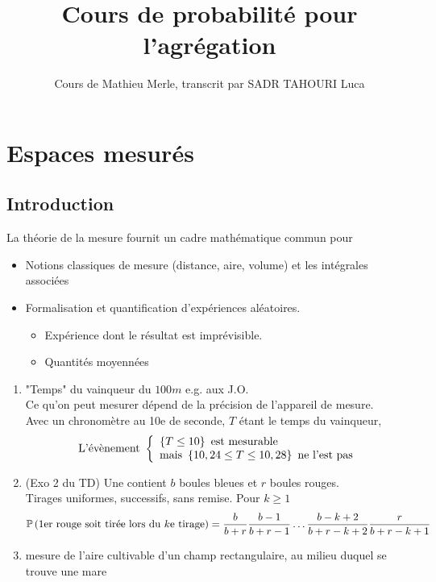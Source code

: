 \documentclass[]{report}
\title{Cours de probabilité pour l'agrégation}
\author{Cours de Mathieu Merle, transcrit par SADR TAHOURI Luca}
\date{}
\begin{document}
    \maketitle
    \tableofcontents

\chapter{Espaces mesurés}

\section{Introduction}

La théorie de la mesure fournit un cadre mathématique commun pour
\begin{itemize}
    \item Notions classiques de mesure (distance, aire, volume) et les intégrales associées
    \item Formalisation et quantification d'expériences aléatoires.
    \begin{itemize}[label=$\hookrightarrow$]
        \item Expérience dont le résultat est imprévisible.
        \item Quantités moyennées
    \end{itemize}
\end{itemize}

\begin{ex}{}{}
    \begin{enumerate}
        \item "Temps" du vainqueur du $100m$ e.g. aux J.O.\\
        Ce qu'on peut mesurer dépend de la précision de l'appareil de mesure.\\
        Avec un chronomètre au 10e de seconde, $T$ étant le temps du vainqueur,
        \[\text{L'évènement } \left\{\begin{array}{ll} \left\{ T\le 10\right\}\text{ est mesurable}\\ \text{mais }\left\{10,24\le T\le 10,28\right\}\text{ ne l'est pas}  \end{array} \right.\]
        \item (Exo 2 du TD) Une contient $b$ boules bleues et $r$ boules rouges.\\
        Tirages uniformes, successifs, sans remise. Pour $k\ge 1$
        \[\mathbb{P}\left(\text{1er rouge soit tirée lors du $k$e tirage}\right)=\dfrac{b}{b+r}\dfrac{b-1}{b+r-1}\ldots \dfrac{b-k+2}{b+r-k+2}\dfrac{r}{b+r-k+1}\]
        \item mesure de l'aire cultivable d'un champ rectangulaire, au milieu duquel se trouve une mare
    \end{enumerate}
\end{ex}
\end{document}
